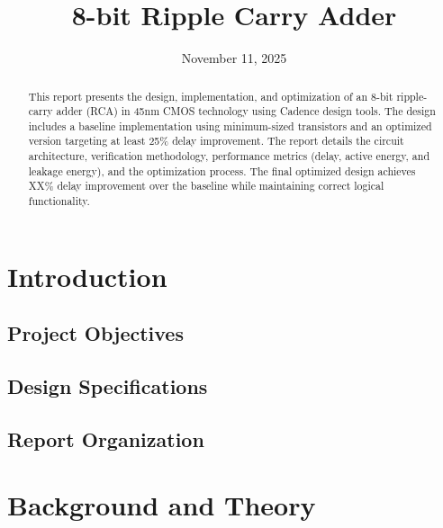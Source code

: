 \documentclass[12pt,letterpaper]{article}
\title{\textbf{8-bit Ripple Carry Adder} \\}
\date{November 11, 2025}
\begin{document}
\maketitle
\thispagestyle{empty}

\vspace{1cm}

\begin{abstract}
This report presents the design, implementation, and optimization of an 8-bit ripple-carry adder (RCA) in 45nm CMOS technology using Cadence design tools. The design includes a baseline implementation using minimum-sized transistors and an optimized version targeting at least 25\% delay improvement. The report details the circuit architecture, verification methodology, performance metrics (delay, active energy, and leakage energy), and the optimization process. The final optimized design achieves XX\% delay improvement over the baseline while maintaining correct logical functionality.
\end{abstract}

\newpage

\tableofcontents

\newpage

\section{Introduction}
\label{sec:introduction}


\subsection{Project Objectives}

\subsection{Design Specifications}

\subsection{Report Organization}

\section{Background and Theory}
\label{sec:background}
\end{document}
